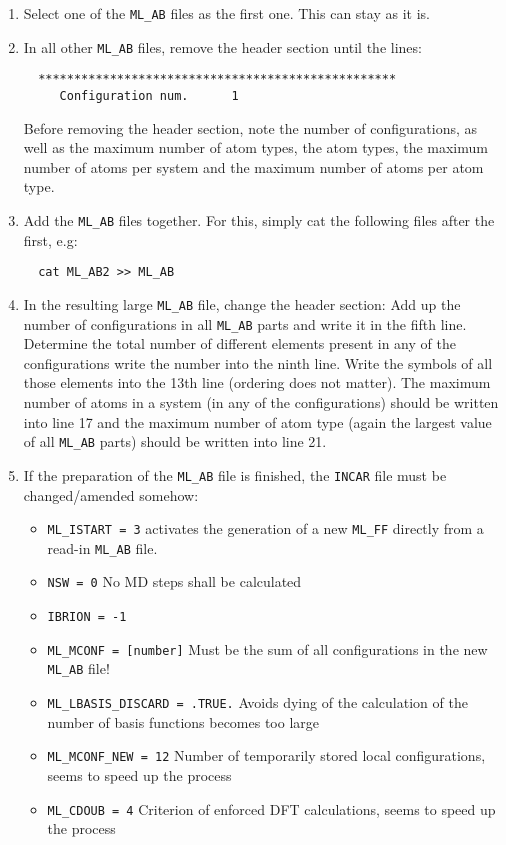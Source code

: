 \documentclass[a4paper,11pt]{article}
\begin{document}
\begin{enumerate}
 \item Select one of the \texttt{ML\_AB} files as the first one. This can stay as it is.
 \item In all other \texttt{ML\_AB} files, remove the header section until the lines:
 
 \begin{verbatim}
  **************************************************
     Configuration num.      1
 \end{verbatim}
 Before removing the header section, note the number of configurations, as well as the maximum number of 
 atom types, the atom types, the maximum number of atoms per system and the maximum number of atoms per atom type.
 
 \item Add the \texttt{ML\_AB} files together. For this, simply cat the following files after the first, e.g:
 
 \begin{verbatim}
  cat ML_AB2 >> ML_AB
 \end{verbatim}

 \item In the resulting large \texttt{ML\_AB} file, change the header section: Add up the number of configurations in all
  \texttt{ML\_AB} parts and write it in the fifth line.
  Determine the total number of different elements present in any of the configurations write the number into
  the ninth line. Write the symbols of all those elements into the 13th line (ordering does not matter). The maximum
  number of atoms in a system (in any of the configurations) should be written into line 17 and the maximum number 
  of atom type (again the largest value of all \texttt{ML\_AB} parts) should be written into line 21.
  

  \item  If the preparation of the \texttt{ML\_AB} file is finished, the \texttt{INCAR} file must be changed/amended somehow:
  \begin{itemize}
   \item \texttt{ML\_ISTART = 3} activates the generation of a new \texttt{ML\_FF} directly from a read-in \texttt{ML\_AB} file. 
   \item \texttt{NSW = 0} No MD steps shall be calculated
   \item \texttt{IBRION = -1}
   \item \texttt{ML\_MCONF = [number]} Must be the sum of all configurations in the new \texttt{ML\_AB} file!
   \item \texttt{ML\_LBASIS\_DISCARD = .TRUE.} Avoids dying of the calculation of the number of basis functions becomes too large
   \item \texttt{ML\_MCONF\_NEW = 12} Number of temporarily stored local configurations, seems to speed up the process
   \item \texttt{ML\_CDOUB = 4} Criterion of enforced DFT calculations, seems to speed up the process
   \end{itemize}


\end{enumerate}
\end{document}
